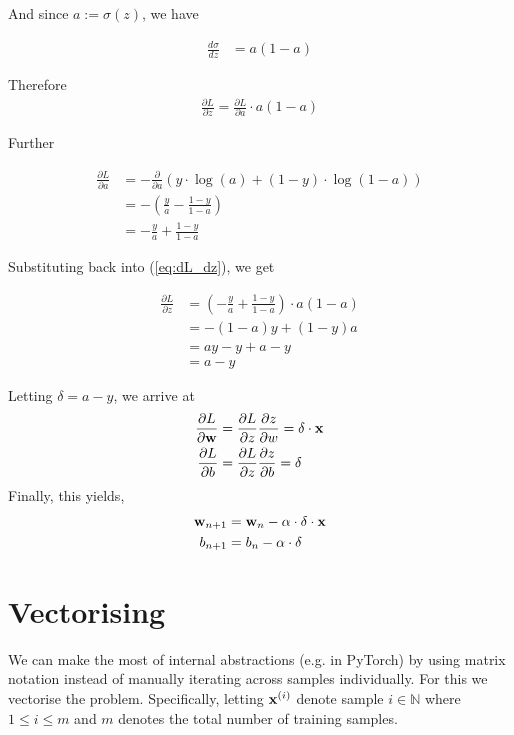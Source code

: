 \documentclass[a4paper]{article}
\begin{document}
And since $a := \sigma(z)$, we have

\begin{align}
\frac{d\sigma}{dz} &= a(1 - a)
\end{align}

Therefore
\begin{align}
\frac{\partial L}{\partial z} = \frac{\partial L}{\partial a} \cdot a(1-a)
\label{eq:dL_dz}
\end{align}

Further

\begin{align}
\frac{\partial L}{\partial a} &= - \frac{\partial}{\partial a} \left(y \cdot \log(a) + (1-y) \cdot \log(1-a)\right) \\
 &= - \left( \frac{y}{a} - \frac{1-y}{1-a} \right) \\
 &= -\frac{y}{a} + \frac{1-y}{1-a}
\end{align}

Substituting back into (\ref{eq:dL_dz}), we get

\begin{align}
\frac{\partial L}{\partial z} &= \left( -\frac{y}{a} + \frac{1-y}{1-a} \right) \cdot a(1-a) \\
 &= -(1-a)y + (1-y)a \\
 &= ay - y + a - y \\
 &= a - y
\end{align}

Letting $\delta = a -y$, we arrive at
\begin{align}
\frac{\partial L}{\partial \bold w} &= \frac{\partial L}{\partial z} \frac{\partial z}{\partial w} = \delta\cdot\bold x \\
\frac{\partial L}{\partial b} &= \frac{\partial L}{\partial z} \frac{\partial z}{\partial b} = \delta \\
\end{align}
Finally, this yields,
\begin{align}
\bold w_{n+1} &= \bold w_n - \alpha \cdot \delta \cdot \bold x \\
b_{n+1} &= b_n - \alpha \cdot \delta
\end{align}




\newpage
\section{Vectorising}
We can make the most of internal abstractions (e.g. in PyTorch) by using matrix notation instead of manually iterating across samples individually. For this we vectorise the problem. Specifically, letting $\bold x ^{(i)}$ denote sample $i \in \mathbb{N}$ where $1 \le i \le m$ and $m$ denotes the total number of training samples.
\end{document}
